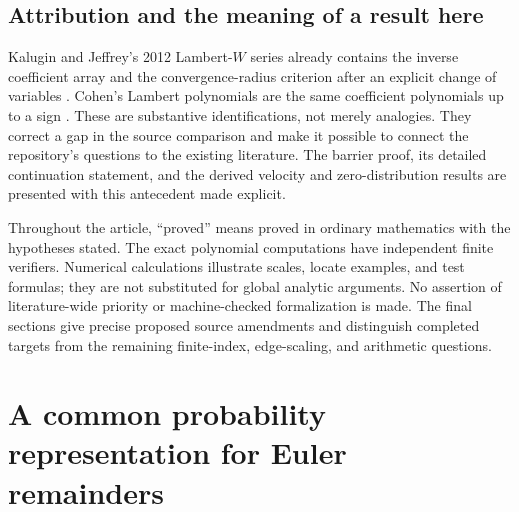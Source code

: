 \documentclass[11pt]{article}
\numberwithin{equation}{section}
\theoremstyle{definition}
\theoremstyle{remark}
\begin{document}
\subsection{Attribution and the meaning of a result here}

Kalugin and Jeffrey's 2012 Lambert-$W$ series already contains the
inverse coefficient array and the convergence-radius criterion after
an explicit change of variables \cite{KaluginJeffrey2012}. Cohen's
Lambert polynomials are the same coefficient polynomials up to a sign
\cite{Cohen2021}. These are substantive identifications, not merely
analogies. They correct a gap in the source comparison and make it
possible to connect the repository's questions to the existing
literature. The barrier proof, its detailed continuation statement,
and the derived velocity and zero-distribution results are presented
with this antecedent made explicit.

Throughout the article, ``proved'' means proved in ordinary mathematics
with the hypotheses stated. The exact polynomial computations have
independent finite verifiers. Numerical calculations illustrate scales,
locate examples, and test formulas; they are not substituted for
global analytic arguments. No assertion of literature-wide priority
or machine-checked formalization is made. The final sections give
precise proposed source amendments and distinguish completed targets
from the remaining finite-index, edge-scaling, and arithmetic questions.


\section{A common probability representation for Euler remainders}
\label{sec:setup}
\end{document}

